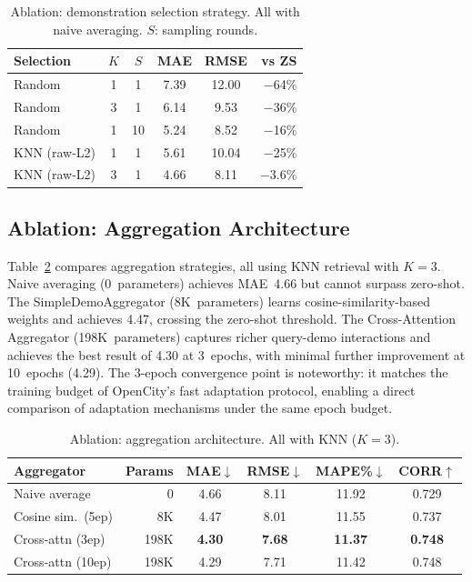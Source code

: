 \documentclass[conference]{IEEEtran}
\begin{document}
\begin{table}[t]
\centering
\caption{Ablation: demonstration selection strategy. All with naive averaging. $S$: sampling rounds.}
\label{tab:demo_selection}
\begin{tabular}{@{}lccccr@{}}
\toprule
Selection & $K$ & $S$ & MAE & RMSE & vs ZS \\
\midrule
Random & 1 & 1 & 7.39 & 12.00 & $-$64\% \\
Random & 3 & 1 & 6.14 & 9.53 & $-$36\% \\
Random & 1 & 10 & 5.24 & 8.52 & $-$16\% \\
\midrule
KNN (raw-L2) & 1 & 1 & 5.61 & 10.04 & $-$25\% \\
KNN (raw-L2) & 3 & 1 & 4.66 & 8.11 & $-$3.6\% \\
\bottomrule
\end{tabular}
\end{table}

\subsection{Ablation: Aggregation Architecture}

Table~\ref{tab:aggregation} compares aggregation strategies, all using KNN retrieval with $K{=}3$.
Naive averaging (0~parameters) achieves MAE~4.66 but cannot surpass zero-shot.
The SimpleDemoAggregator (8K~parameters) learns cosine-similarity-based weights and achieves 4.47, crossing the zero-shot threshold.
The Cross-Attention Aggregator (198K~parameters) captures richer query-demo interactions and achieves the best result of 4.30 at 3~epochs, with minimal further improvement at 10~epochs (4.29).
The 3-epoch convergence point is noteworthy: it matches the training budget of OpenCity's fast adaptation protocol, enabling a direct comparison of adaptation mechanisms under the same epoch budget.

\begin{table}[t]
\centering
\caption{Ablation: aggregation architecture. All with KNN ($K{=}3$).}
\label{tab:aggregation}
\begin{tabular}{@{}lrcccc@{}}
\toprule
Aggregator & Params & MAE$\downarrow$ & RMSE$\downarrow$ & MAPE\%$\downarrow$ & CORR$\uparrow$ \\
\midrule
Naive average & 0 & 4.66 & 8.11 & 11.92 & 0.729 \\
Cosine sim.\ (5ep) & 8K & 4.47 & 8.01 & 11.55 & 0.737 \\
Cross-attn (3ep) & 198K & \textbf{4.30} & \textbf{7.68} & \textbf{11.37} & \textbf{0.748} \\
Cross-attn (10ep) & 198K & 4.29 & 7.71 & 11.42 & 0.748 \\
\bottomrule
\end{tabular}
\end{table}
\end{document}
